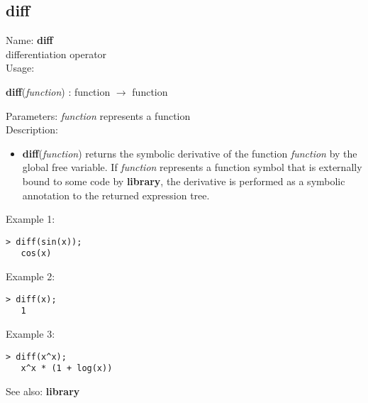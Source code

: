 \subsection{ diff }
\noindent Name: \textbf{diff}\\
differentiation operator\\

\noindent Usage: 
\begin{center}
\textbf{diff}(\emph{function}) : \textsf{function} $\rightarrow$ \textsf{function}\\
\end{center}
Parameters: 
\emph{function} represents a function\\

\noindent Description: \begin{itemize}

\item \textbf{diff}(\emph{function}) returns the symbolic derivative of the function
   \emph{function} by the global free variable.
   If \emph{function} represents a function symbol that is externally bound
   to some code by \textbf{library}, the derivative is performed as a symbolic
   annotation to the returned expression tree.
\end{itemize}
\noindent Example 1: 
\begin{center}\begin{minipage}{14.8cm}\begin{Verbatim}[frame=single]
   > diff(sin(x));
   cos(x)
\end{Verbatim}
\end{minipage}\end{center}
\noindent Example 2: 
\begin{center}\begin{minipage}{14.8cm}\begin{Verbatim}[frame=single]
   > diff(x);
   1
\end{Verbatim}
\end{minipage}\end{center}
\noindent Example 3: 
\begin{center}\begin{minipage}{14.8cm}\begin{Verbatim}[frame=single]
   > diff(x^x);
   x^x * (1 + log(x))
\end{Verbatim}
\end{minipage}\end{center}
See also: \textbf{library}
